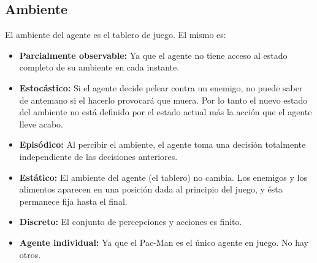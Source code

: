 \subsection{Ambiente}

El ambiente del agente es el tablero de juego. El mismo es:

\begin{itemize}
\item \textbf{Parcialmente observable:} Ya que el agente no tiene acceso al
estado completo de su ambiente en cada instante.

\item \textbf{Estocástico:} Si el agente decide pelear contra un enemigo, no
puede saber de antemano si el hacerlo provocará que muera. Por lo tanto el
nuevo estado del ambiente no está definido por el estado actual más la acción
que el agente lleve acabo.

\item \textbf{Episódico:} Al percibir el ambiente, el agente toma una decisión
totalmente independiente de las decisiones anteriores.

\item \textbf{Estático:} El ambiente del agente (el tablero) no cambia. Los
enemigos y los alimentos aparecen en una posición dada al principio del juego,
y ésta permanece fija hasta el final.

\item \textbf{Discreto:} El conjunto de percepciones y acciones es finito.

\item \textbf{Agente individual:} Ya que el Pac-Man es el único agente en
juego.  No hay otros.

\end{itemize}

